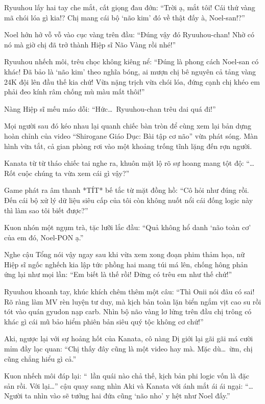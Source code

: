 \documentclass[../main.tex]{subfiles}
\begin{document}
Ryuuhou lấy hai tay che mắt, cất giọng đau đớn: ``Trời ạ, mắt tôi! Cái thứ vàng mã chói lóa gì kia!? Chị mang cái bộ `não kim' đó về thật đấy à, Noel-san!?''

Noel hớn hở vỗ vỗ vào cục vàng trên đầu: ``Đúng vậy đó Ryuuhou-chan! Nhờ có nó mà giờ chị đã trở thành Hiệp sĩ Não Vàng rồi nhé!''

Ryuuhou nhếch môi, trêu chọc không kiêng nể: ``Đúng là phong cách Noel-san có khác! Đã bảo là `não kim' theo nghĩa bóng, ai mượn chị bê nguyên cả tảng vàng 24K đội lên đầu thế kia chứ! Vừa nặng trịch vừa chói lóa, đứng cạnh chị khéo em phải đeo kính râm chống mù màu mất thôi!''

Nàng Hiệp sĩ mếu máo dỗi: ``Hức\dots\ Ryuuhou-chan trêu dai quá đi!''

Mọi người sau đó kéo nhau lại quanh chiếc bàn tròn để cùng xem lại bản dựng hoàn chỉnh của video ``Shirogane Giáo Dục: Bài tập cơ não'' vừa phát sóng. Màn hình vừa tắt, cả gian phòng rơi vào một khoảng trống tĩnh lặng đến rợn người.

Kanata từ từ tháo chiếc tai nghe ra, khuôn mặt lộ rõ sự hoang mang tột độ: ``\dots Rốt cuộc chúng ta vừa xem cái gì vậy?''

Game phát ra âm thanh *TÍT* bế tắc từ mặt đồng hồ: ``Cô hỏi như đúng rồi. Đến cái bộ xử lý dữ liệu siêu cấp của tôi còn không nuốt nổi cái đống logic này thì làm sao tôi biết được?''

Kuon nhón một ngụm trà, tặc lưỡi lắc đầu: ``Quả không hổ danh `não toàn cơ' của em đó, Noel-PON ạ.''

Nghe cậu Tổng nói vậy ngay sau khi vừa xem xong đoạn phim thảm họa, nữ Hiệp sĩ ngốc nghếch kia lập tức phồng hai mang túi má lên, chống hông phản ứng lại như mọi lần: ``Em biết là thế rồi! Đừng có trêu em như thế chứ!''

Ryuuhou khoanh tay, khúc khích chêm thêm một câu: ``Thì Onii nói đâu có sai! Rõ ràng làm MV rèn luyện tư duy, mà kịch bản toàn lặn biển ngắm vịt cao su rồi tót vào quán gyudon nạp carb. Nhìn bộ não vàng lơ lửng trên đầu chị trông có khác gì cái mũ bảo hiểm phiên bản siêu quý tộc không cơ chứ!''

Aki, ngược lại với sự hoảng hốt của Kanata, cô nàng Dị giới lại gãi gãi má cười mỉm đầy lạc quan: ``Chị thấy đây cũng là một video hay mà. Mặc dù\dots\ ừm, chị cũng chẳng hiểu gì cả.''

Kuon nhếch môi đáp lại: ``\hll\ lần quái nào chả thế, kịch bản phi logic vốn là đặc sản rồi. Với lại\dots'' cậu quay sang nhìn Aki và Kanata với ánh mắt ái ái ngại: ``\dots Người ta nhìn vào sẽ tưởng hai đứa cũng `não nho' y hệt như Noel đấy.''
\end{document}
